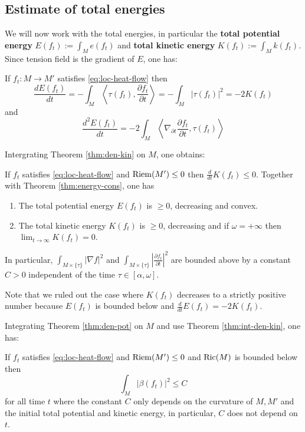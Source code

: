 \subsection{Estimate of total energies}
\label{sec:orgcde4a70}

We will now work with the total energies, in particular the \textbf{total potential energy} \(E(f_t) := \int_M e(f_t)\) and \textbf{total kinetic energy} \(K(f_t) := \int_M k(f_t)\). Since
tension field is the gradient of \(E\), one has:

\begin{theorem}
\label{thm:energy-cons}
If \(f_t: M \longrightarrow  M'\) satisfies \eqref{eq:loc-heat-flow} then
\[
 \frac{d E(f_t)}{dt} = -\int_M \left\langle \tau(f_t), \frac{\partial f_t}{\partial t}
\right \rangle = -\int_M |\tau(f_t)|^2 = -2K(f_t)
\]
and
\[
\frac{d^2 E(f_t)}{dt} = -2\int_M \left \langle \nabla_{\partial t}\frac{\partial
f_t}{\partial t},\tau(f_t)\right \rangle
\]
\end{theorem}

Intergrating Theorem \ref{thm:den-kin} on \(M\), one obtains:

\begin{theorem}
\label{thm:int-den-kin}
If \(f_t\) satisfies \eqref{eq:loc-heat-flow} and \(\mathop{\rm Riem}\nolimits(M')\leq 0\) then \(\frac{d
}{dt}K(f_t) \leq 0\). Together with Theorem \ref{thm:energy-cons}, one has
\begin{enumerate}
\item The total potential energy \(E(f_t)\) is \(\geq 0\), decreasing and convex.
\item The total kinetic energy \(K(f_t)\) is \(\geq 0\), decreasing and if \(\omega =
   +\infty\) then \(\lim_{t\to\infty} K(f_t) = 0\).
\end{enumerate}
In particular, \(\int_{M\times \{\tau\}} |\nabla f|^2\) and \(\int_{M\times\{\tau\}} \left|
\frac{\partial f_t}{\partial t} \right|^2\) are bounded above by a constant \(C>0\)
independent of the time \(\tau \in[\alpha,\omega]\).
\end{theorem}
Note that we ruled out the case where \(K(f_t)\) decreases to a strictly positive number
because \(E(f_t)\) is bounded below and \(\frac{d }{d t} E(f_t) = -2K(f_t)\).


Integrating Theorem \ref{thm:den-pot} on \(M\) and use Theorem \ref{thm:int-den-kin}, one has:

\begin{theorem}
\label{thm:int-den-pot}
If \(f_t\) satisfies \eqref{eq:loc-heat-flow} and \(\mathop{\rm Riem}\nolimits(M')\leq 0\) and \(\mathop{\rm Ric}\nolimits(M)\)
is bounded below then 
\[
\int_M |\beta(f_t)|^2 \leq C
\]
for all time \(t\) where the constant \(C\) only depends on the curvature of \(M, M'\) and the initial total potential and kinetic energy, in particular, \(C\) does not depend on \(t\).
\end{theorem}

